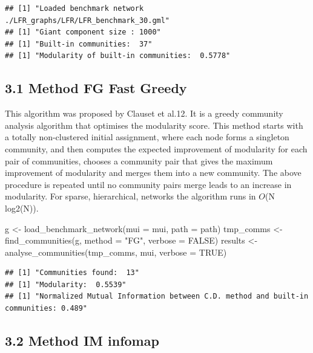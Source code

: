 \documentclass[
]{article}
\newenvironment{Shaded}{\begin{snugshade}}{\end{snugshade}}
\newcommand{\AttributeTok}[1]{\textcolor[rgb]{0.77,0.63,0.00}{#1}}
\newcommand{\ConstantTok}[1]{\textcolor[rgb]{0.00,0.00,0.00}{#1}}
\newcommand{\FunctionTok}[1]{\textcolor[rgb]{0.00,0.00,0.00}{#1}}
\newcommand{\NormalTok}[1]{#1}
\newcommand{\OtherTok}[1]{\textcolor[rgb]{0.56,0.35,0.01}{#1}}
\newcommand{\StringTok}[1]{\textcolor[rgb]{0.31,0.60,0.02}{#1}}
\begin{document}
\begin{verbatim}
## [1] "Loaded benchmark network ./LFR_graphs/LFR/LFR_benchmark_30.gml"
## [1] "Giant component size : 1000"
## [1] "Built-in communities:  37"
## [1] "Modularity of built-in communities:  0.5778"
\end{verbatim}

\newpage

\hypertarget{method-fg-fast-greedy}{%
\subsection{3.1 Method FG Fast Greedy}\label{method-fg-fast-greedy}}

This algorithm was proposed by Clauset et al.12. It is a greedy
community analysis algorithm that optimises the modularity score. This
method starts with a totally non-clustered initial assignment, where
each node forms a singleton community, and then computes the expected
improvement of modularity for each pair of communities, chooses a
community pair that gives the maximum improvement of modularity and
merges them into a new community. The above procedure is repeated until
no community pairs merge leads to an increase in modularity. For sparse,
hierarchical, networks the algorithm runs in \(O\)(N log2(N)).

\begin{Shaded}
\begin{Highlighting}[]
\NormalTok{g }\OtherTok{\textless{}{-}} \FunctionTok{load\_benchmark\_network}\NormalTok{(}\AttributeTok{mui =}\NormalTok{ mui, }\AttributeTok{path =}\NormalTok{ path)}
\NormalTok{tmp\_comms }\OtherTok{\textless{}{-}} \FunctionTok{find\_communities}\NormalTok{(g, }\AttributeTok{method =} \StringTok{"FG"}\NormalTok{, }\AttributeTok{verbose =} \ConstantTok{FALSE}\NormalTok{)}
\NormalTok{results }\OtherTok{\textless{}{-}} \FunctionTok{analyse\_communities}\NormalTok{(tmp\_comms, mui, }\AttributeTok{verbose =} \ConstantTok{TRUE}\NormalTok{)}
\end{Highlighting}
\end{Shaded}

\begin{verbatim}
## [1] "Communities found:  13"
## [1] "Modularity:  0.5539"
## [1] "Normalized Mutual Information between C.D. method and built-in communities: 0.489"
\end{verbatim}

\hypertarget{method-im-infomap}{%
\subsection{3.2 Method IM infomap}\label{method-im-infomap}}
\end{document}
